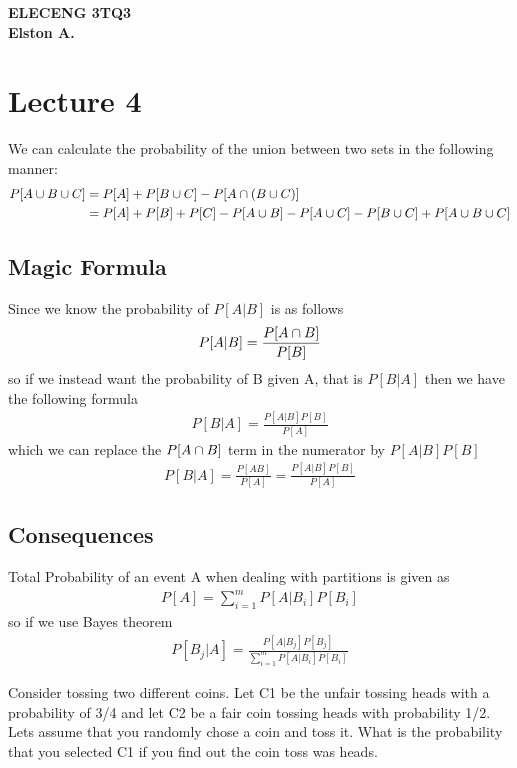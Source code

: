 \documentclass[12pt, titlepage, oneside]{article}
\begin{document}
	
	\textbf{ELECENG 3TQ3}\\
	\textbf{Elston A.}
	
\section{Lecture 4}
We can calculate the probability of the union between two sets in the following manner:
\begin{align*}
P[A\cup B\cup C] &= P[A] + P[B \cup C] - P[A \cap (B \cup C)] \\
&= P[A] + P[B] + P[C] - P[A\cup B] - P[A \cup C] - P[B \cup C] + P[A \cup B \cup C]
\end{align*}

\subsection{Magic Formula}

Since we know the probability of $P[A|B]$ is as follows
\begin{align*}
P[A|B] = \frac{P[A \cap B]}{P[B]}
\end{align*}
so if we instead want the probability of B given A, that is $P[B|A]$ then we have the following formula
\begin{align*}
P[B|A] = \frac{P[A | B]P[B]}{P[A]}
\end{align*}
which we can replace the $P[A \cap B]$ term in the numerator by $P[A|B] P[B]$
\begin{align}
P[B|A] = \frac{P[AB]}{P[A]} = \frac{P[A|B] P[B]}{P[A]}
\end{align}

\subsection{Consequences}

Total Probability of an event A when dealing with partitions is given as 
\begin{align}
	P[A] = \sum_{i=1}^m P[A|B_i]P[B_i]
\end{align}
so if we use Bayes theorem
\begin{align}
P[B_j | A] = \frac{P[A|B_j] P[B_j]}{\sum_{i=1}^m P[A|B_i]  P[B_i] }
\end{align}

\ex Consider tossing two different coins. Let C1 be the unfair tossing heads with a probability of 3/4 and let C2 be a fair coin tossing heads with probability 1/2. Lets assume that you randomly chose a coin and toss it. What is the probability that you selected C1 if you find out the coin toss was heads. 
\end{document}
